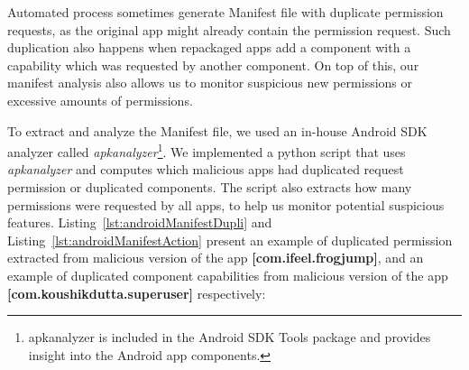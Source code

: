 
Automated process sometimes generate Manifest file with duplicate permission requests, as the original app might already contain the permission request. Such duplication also happens when repackaged apps add a component with a capability which was requested by another component. On top of this, our manifest analysis also allows us to monitor suspicious new permissions or excessive amounts of permissions. 

To extract and analyze the Manifest file, we used an in-house Android SDK analyzer called \textit{apkanalyzer}\footnote{apkanalyzer is included in the Android SDK Tools package and provides insight into the Android app components.}. We implemented a python script that uses \textit{apkanalyzer} and computes which malicious apps had duplicated request permission or duplicated components. The script also extracts how many permissions were requested by all apps, to help us monitor potential suspicious features. Listing~\ref{lst:androidManifestDupli} and Listing~\ref{lst:androidManifestAction} present an example of duplicated permission extracted from malicious version of the app \textbf{[com.ifeel.frogjump]}, and an example of duplicated component capabilities from malicious version of the app \textbf{[com.koushikdutta.superuser]} respectively:


